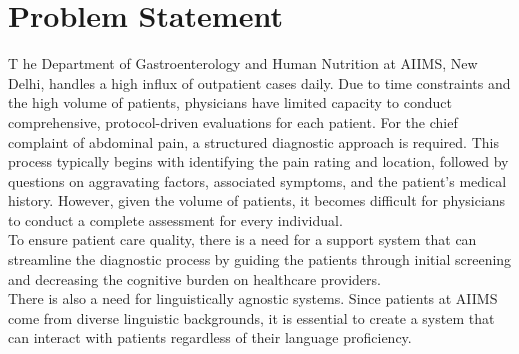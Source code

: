 \section{Problem Statement}
\lettrine{T}{ }he Department of Gastroenterology and Human Nutrition at AIIMS, New Delhi, handles a high influx of outpatient cases daily. Due to time constraints and the high volume of patients, physicians have limited capacity to conduct comprehensive, protocol-driven evaluations for each patient. For the chief complaint of abdominal pain, a structured diagnostic approach is required. This process typically begins with identifying the pain rating and location, followed by questions on aggravating factors, associated symptoms, and the patient's medical history. However, given the volume of patients, it becomes difficult for physicians to conduct a complete assessment for every individual.\\[\baselineskip]

\noindent To ensure patient care quality, there is a need for a support system that can streamline the diagnostic process by guiding the patients through initial screening and decreasing the cognitive burden on healthcare providers.\\[\baselineskip]

\noindent There is also a need for linguistically agnostic systems. Since patients at AIIMS come from diverse linguistic backgrounds, it is essential to create a system that can interact with patients regardless of their language proficiency.


